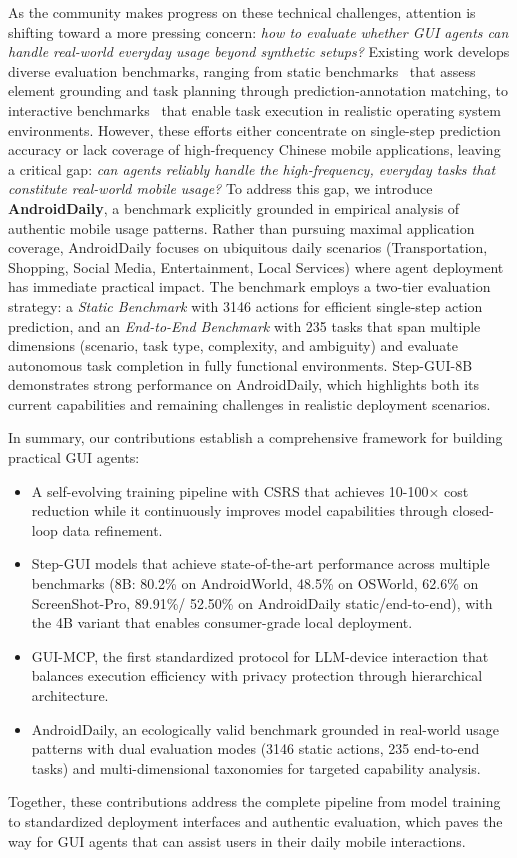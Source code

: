 As the community makes progress on these technical challenges, attention is shifting toward a more pressing concern: \textit{how to evaluate whether GUI agents can handle real-world everyday usage beyond synthetic setups?} Existing work develops diverse evaluation benchmarks, ranging from static benchmarks~\cite{cheng2024seeclick, wu2024atlas, li2025screenspotpro, li2025autogui, burns2022dataset_motif, rastogi2021uibert_refexp, zhang2024llamatouch, liu2024visualwebbench_vwb} that assess element grounding and task planning through prediction-annotation matching, to interactive benchmarks~\cite{rawles2024androidworld, xie2024osworld} that enable task execution in realistic operating system environments. However, these efforts either concentrate on single-step prediction accuracy or lack coverage of high-frequency Chinese mobile applications, leaving a critical gap: \textit{can agents reliably handle the high-frequency, everyday tasks that constitute real-world mobile usage?} To address this gap, we introduce \textbf{AndroidDaily}, a benchmark explicitly grounded in empirical analysis of authentic mobile usage patterns. Rather than pursuing maximal application coverage, AndroidDaily focuses on ubiquitous daily scenarios (Transportation, Shopping, Social Media, Entertainment, Local Services) where agent deployment has immediate practical impact. The benchmark employs a two-tier evaluation strategy: a \textit{Static Benchmark} with 3146 actions for efficient single-step action prediction, and an \textit{End-to-End Benchmark} with 235 tasks that span multiple dimensions (scenario, task type, complexity, and ambiguity) and evaluate autonomous task completion in fully functional environments. Step-GUI-8B demonstrates strong performance on AndroidDaily, which highlights both its current capabilities and remaining challenges in realistic deployment scenarios.



In summary, our contributions establish a comprehensive framework for building practical GUI agents:
\begin{itemize}
\item A self-evolving training pipeline with CSRS that achieves 10-100$\times$ cost reduction while it continuously improves model capabilities through closed-loop data refinement.
\item Step-GUI models that achieve state-of-the-art performance across multiple benchmarks (8B: 80.2\% on AndroidWorld, 48.5\% on OSWorld, 62.6\% on ScreenShot-Pro, 89.91\%/ 52.50\% on AndroidDaily static/end-to-end), with the 4B variant that enables consumer-grade local deployment.
\item GUI-MCP, the first standardized protocol for LLM-device interaction that balances execution efficiency with privacy protection through hierarchical architecture.
\item AndroidDaily, an ecologically valid benchmark grounded in real-world usage patterns with dual evaluation modes (3146 static actions, 235 end-to-end tasks) and multi-dimensional taxonomies for targeted capability analysis.
\end{itemize}

Together, these contributions address the complete pipeline from model training to standardized deployment interfaces and authentic evaluation, which paves the way for GUI agents that can assist users in their daily mobile interactions.
